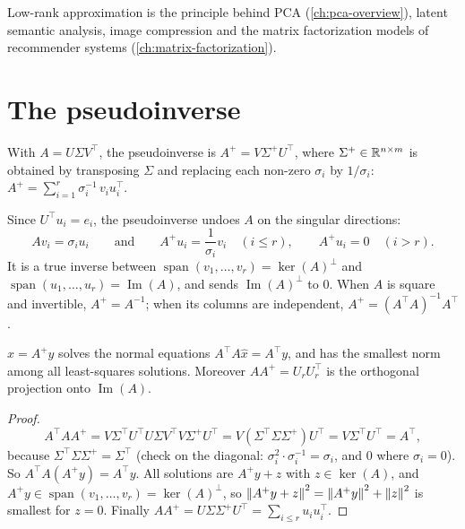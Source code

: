 \begin{notechapter}
Low-rank approximation is the principle behind PCA (\cref{ch:pca-overview}), latent
semantic analysis, image compression and the matrix factorization models of
recommender systems (\cref{ch:matrix-factorization}).

\section{The pseudoinverse}\label{svd:sec:pseudoinverse}

\begin{definition}
With $A = U\Sigma V^\top$, the pseudoinverse is $A^+ = V\Sigma^+U^\top$, where
$\Sigma^+\in\mathbb{R}^{n\times m}$ is obtained by transposing $\Sigma$ and replacing each non-zero
$\sigma_i$ by $1/\sigma_i$: $A^+ = \sum_{i=1}^r\sigma_i^{-1}\,v_iu_i^\top$.
\end{definition}

Since $U^\top u_i = e_i$, the pseudoinverse undoes $A$ on the singular directions:
\[
  Av_i = \sigma_iu_i\qquad\text{and}\qquad A^+u_i = \frac1{\sigma_i}v_i\quad(i\leq r),
  \qquad A^+u_i = 0\quad(i>r).
\]
It is a true inverse between $\operatorname{span}(v_1,\dots,v_r) = \ker(A)^\perp$ and
$\operatorname{span}(u_1,\dots,u_r) = \operatorname{Im}(A)$, and sends
$\operatorname{Im}(A)^\perp$ to $0$. When $A$ is square and invertible, $A^+ = A^{-1}$; when
its columns are independent, $A^+ = (A^\top A)^{-1}A^\top$.

\begin{theorem}\label{svd:thm:minnorm}
$\hat x = A^+y$ solves the normal equations $A^\top A\hat x = A^\top y$, and has the smallest
norm among all least-squares solutions. Moreover $AA^+ = U_rU_r^\top$ is the orthogonal
projection onto $\operatorname{Im}(A)$.
\end{theorem}

\begin{proof}
\[
A^\top A A^+ = V\Sigma^\top U^\top U\Sigma V^\top V\Sigma^+U^\top = V(\Sigma^\top\Sigma\Sigma^+)U^\top = V\Sigma^\top U^\top = A^\top,
\]
because $\Sigma^\top\Sigma\Sigma^+ = \Sigma^\top$ (check on the diagonal: $\sigma_i^2\cdot\sigma_i^{-1} = \sigma_i$, and
$0$ where $\sigma_i = 0$). So $A^\top A(A^+y) = A^\top y$. All solutions are $A^+y + z$ with
$z\in\ker(A)$, and $A^+y\in\operatorname{span}(v_1,\dots,v_r) = \ker(A)^\perp$, so
$\left\|A^+y + z\right\|^2 = \left\|A^+y\right\|^2 + \left\|z\right\|^2$ is smallest for $z = 0$. Finally
$AA^+ = U\Sigma\Sigma^+U^\top = \sum_{i\leq r}u_iu_i^\top$.
\end{proof}


\end{notechapter}

